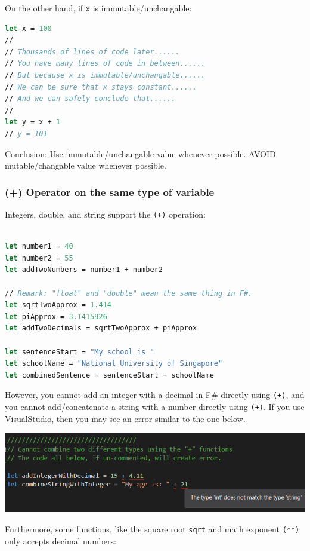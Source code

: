 \documentclass[12pt]{article}
\begin{document}
On the other hand, if \texttt{x} is immutable/unchangable:

\begin{lstlisting}[language=FSharp]
let x = 100
//
// Thousands of lines of code later......
// You have many lines of code in between......
// But because x is immutable/unchangable......
// We can be sure that x stays constant......
// And we can safely conclude that......
//
let y = x + 1
// y = 101
\end{lstlisting}
Conclusion: Use immutable/unchangable value whenever possible. AVOID mutable/changable value whenever possible.

\pagebreak

\subsubsection{(+) Operator on the same type of variable}

Integers, double, and string support the \texttt{(+)} operation:
\begin{lstlisting}[language=FSharp]

let number1 = 40
let number2 = 55
let addTwoNumbers = number1 + number2

// Remark: "float" and "double" mean the same thing in F#.
let sqrtTwoApprox = 1.414
let piApprox = 3.1415926
let addTwoDecimals = sqrtTwoApprox + piApprox

let sentenceStart = "My school is "
let schoolName = "National University of Singapore"
let combinedSentence = sentenceStart + schoolName
\end{lstlisting}
However, you cannot add an integer with a decimal in F\# directly using \texttt{(+)}, and you cannot add/concatenate a string with a number directly using \texttt{(+)}. If you use VisualStudio, then you may see an error similar to the one below.
\begin{center}
\includegraphics[width=14cm]{pictures/picture04.png}
\end{center}
Furthermore, some functions, like the square root \texttt{sqrt} and math exponent \texttt{(**)} only accepts decimal numbers:
\end{document}
